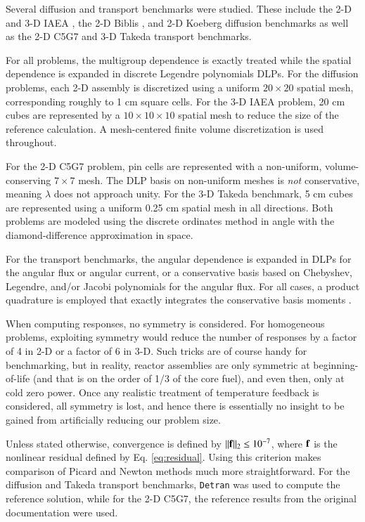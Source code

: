 Several diffusion and transport benchmarks were studied.  These 
include  the 2-D and 3-D IAEA \cite{anl1977benchmark}, the 2-D 
Biblis \cite{muller1991bmd}, and 2-D Koeberg diffusion benchmarks as well 
as the 2-D C5G7 \cite{lewis2001bsd} 
and 3-D Takeda \cite{takeda1991ntb} transport benchmarks.

For all problems, the multigroup dependence is exactly treated while the 
spatial dependence is expanded in discrete Legendre polynomials 
\cite{mosher2006ifr, roberts2014arm} DLPs.  For the diffusion 
problems, each 2-D assembly is discretized 
using a uniform $20\times 20$ spatial mesh, corresponding roughly to 
1 cm square cells.  For the 3-D IAEA problem, 20 cm cubes are 
represented by a $10 \times 10 \times 10$ spatial mesh to reduce 
the size of the reference calculation.   A mesh-centered finite 
volume discretization is used throughout.

For the 2-D C5G7 problem, pin cells are represented with 
a non-uniform, volume-conserving $7\times 7$ 
mesh.   The DLP basis on non-uniform meshes is {\it not} 
conservative, meaning $\lambda$ does not approach unity.
For the 3-D Takeda benchmark, 5 cm 
cubes are represented using a uniform 0.25 cm spatial mesh in 
all directions.  Both problems are modeled using the discrete ordinates 
method in angle with the diamond-difference
approximation in space.

For the transport benchmarks, the angular dependence is expanded 
in DLPs for the angular flux or 
angular current, or a conservative basis based on Chebyshev, Legendre, 
and/or Jacobi polynomials \cite{roberts2014arm, zhang2012ehs} 
for the angular flux.  For all cases, a product quadrature is employed 
that exactly integrates the conservative basis moments \cite{roberts2014arm}.

When computing responses, no symmetry is considered.  For homogeneous
problems, exploiting symmetry would reduce the number of responses 
by a factor of 4 in 2-D or a factor of 6 in 3-D.  Such tricks are 
of course handy for benchmarking, but in reality, reactor assemblies 
are only symmetric at beginning-of-life (and that is on the order 
of 1/3 of the core fuel), and even then, only at cold zero power.  Once
any realistic treatment of temperature feedback is considered, all 
symmetry is lost, and hence there is essentially no insight to be gained 
from artificially reducing our problem size.

Unless stated otherwise, 
convergence is defined by $||\mathbf{f}||_2 \leq 10^{-7}$, where
$\mathbf{f}$ is the nonlinear residual defined by Eq. \ref{eq:residual}.
Using this criterion makes comparison of Picard and Newton methods much 
more straightforward.   For the diffusion and Takeda transport 
benchmarks, {\tt Detran} was used to compute the reference solution, 
while for the 2-D C5G7, the reference results from the original 
documentation were used.


